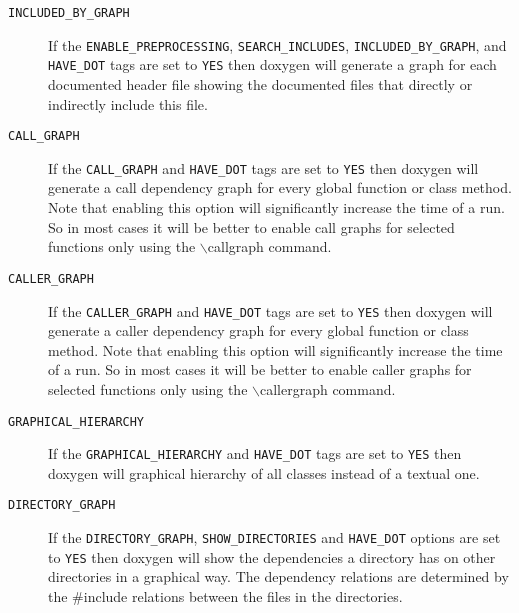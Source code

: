 \begin{description}
\label{config_cfg_included_by_graph}
\hypertarget{config_cfg_included_by_graph}{}
 \item[{\tt INCLUDED\_\-BY\_\-GRAPH} ] If the {\tt ENABLE\_\-PREPROCESSING}, {\tt SEARCH\_\-INCLUDES}, {\tt INCLUDED\_\-BY\_\-GRAPH}, and {\tt HAVE\_\-DOT} tags are set to {\tt YES} then doxygen will generate a graph for each documented header file showing the documented files that directly or indirectly include this file.

\label{config_cfg_call_graph}
\hypertarget{config_cfg_call_graph}{}
 \item[{\tt CALL\_\-GRAPH} ] If the {\tt CALL\_\-GRAPH} and {\tt HAVE\_\-DOT} tags are set to {\tt YES} then doxygen will generate a call dependency graph for every global function or class method. Note that enabling this option will significantly increase the time of a run. So in most cases it will be better to enable call graphs for selected functions only using the $\backslash$callgraph command.

\label{config_cfg_caller_graph}
\hypertarget{config_cfg_caller_graph}{}
 \item[{\tt CALLER\_\-GRAPH} ] If the {\tt CALLER\_\-GRAPH} and {\tt HAVE\_\-DOT} tags are set to {\tt YES} then doxygen will generate a caller dependency graph for every global function or class method. Note that enabling this option will significantly increase the time of a run. So in most cases it will be better to enable caller graphs for selected functions only using the $\backslash$callergraph command.

\label{config_cfg_graphical_hierarchy}
\hypertarget{config_cfg_graphical_hierarchy}{}
 \item[{\tt GRAPHICAL\_\-HIERARCHY} ] If the {\tt GRAPHICAL\_\-HIERARCHY} and {\tt HAVE\_\-DOT} tags are set to {\tt YES} then doxygen will graphical hierarchy of all classes instead of a textual one.

\label{config_cfg_directory_graph}
\hypertarget{config_cfg_directory_graph}{}
 \item[{\tt DIRECTORY\_\-GRAPH} ] If the {\tt DIRECTORY\_\-GRAPH}, {\tt SHOW\_\-DIRECTORIES} and {\tt HAVE\_\-DOT} options are set to {\tt YES} then doxygen will show the dependencies a directory has on other directories in a graphical way. The dependency relations are determined by the \#include relations between the files in the directories.


\end{description}
